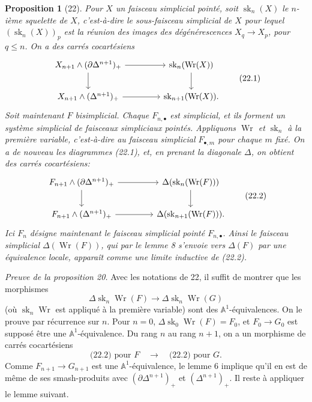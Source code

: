 \documentclass[11pt]{article}
\newcommand{\Aone}{\mathbb A^1}
\theoremstyle{deligne}
\newtheorem*{proposition*}{Proposition}
\newenvironment{proofnamed}[1]{\noindent\textit{#1.}}{}
\newcommand{\sk}{\operatorname{sk}}
\newcommand{\Wr}{\operatorname{Wr}}
\begin{document}
\begin{proposition*}[22]
Pour \(X\) un faisceau simplicial pointé, soit \(\sk_n(X)\) le \(n\)-ième squelette de \(X\), c'est-à-dire le sous-faisceau simplicial de \(X\) pour lequel \((\sk_n(X))_p\) est la réunion des images des dégénérescences \(X_q\to X_p\), pour \(q\le n\). On a des carrés cocartésiens
\[
\begin{tikzcd}[column sep=4.2em,row sep=2.0em]
X_{n+1}\wedge(\partial\Delta^{n+1})_+ \arrow[r] \arrow[d] & \sk_n(\Wr(X)) \arrow[d] \\
X_{n+1}\wedge(\Delta^{n+1})_+ \arrow[r] & \sk_{n+1}(\Wr(X)).
\end{tikzcd}
\tag{22.1}
\]
Soit maintenant \(F\) bisimplicial. Chaque \(F_{n,\bullet}\) est simplicial, et ils forment un système simplicial de faisceaux simpliciaux pointés. Appliquons \(\Wr\) et \(\sk_n\) à la première variable, c'est-à-dire au faisceau simplicial \(F_{\bullet,m}\) pour chaque \(m\) fixé. On a de nouveau les diagrammes (22.1), et, en prenant la diagonale \(\Delta\), on obtient des carrés cocartésiens:
\[
\begin{tikzcd}[column sep=4.2em,row sep=2.0em]
F_{n+1}\wedge(\partial\Delta^{n+1})_+ \arrow[r] \arrow[d] & \Delta(\sk_n(\Wr(F))) \arrow[d] \\
F_{n+1}\wedge(\Delta^{n+1})_+ \arrow[r] & \Delta(\sk_{n+1}(\Wr(F))).
\end{tikzcd}
\tag{22.2}
\]
Ici \(F_n\) désigne maintenant le faisceau simplicial pointé \(F_{n,\bullet}\). Ainsi le faisceau simplicial \(\Delta(\Wr(F))\), qui par le lemme 8 s'envoie vers \(\Delta(F)\) par une équivalence locale, apparaît comme une limite inductive de (22.2).
\end{proposition*}

\begin{proofnamed}{Preuve de la proposition 20}
Avec les notations de 22, il suffit de montrer que les morphismes
\[
\Delta\sk_n\Wr(F)\longrightarrow\Delta\sk_n\Wr(G)
\]
(où \(\sk_n\Wr\) est appliqué à la première variable) sont des \(\Aone\)-équivalences. On le prouve par récurrence sur \(n\). Pour \(n=0\), \(\Delta\sk_0\Wr(F)=F_0\), et \(F_0\to G_0\) est supposé être une \(\Aone\)-équivalence. Du rang \(n\) au rang \(n+1\), on a un morphisme de carrés cocartésiens
\[
\text{(22.2) pour }F\quad\longrightarrow\quad\text{(22.2) pour }G.
\]
Comme \(F_{n+1}\to G_{n+1}\) est une \(\Aone\)-équivalence, le lemme 6 implique qu'il en est de même de ses smash-produits avec \((\partial\Delta^{n+1})_+\) et \((\Delta^{n+1})_+\). Il reste à appliquer le lemme suivant.
\end{proofnamed}
\end{document}
